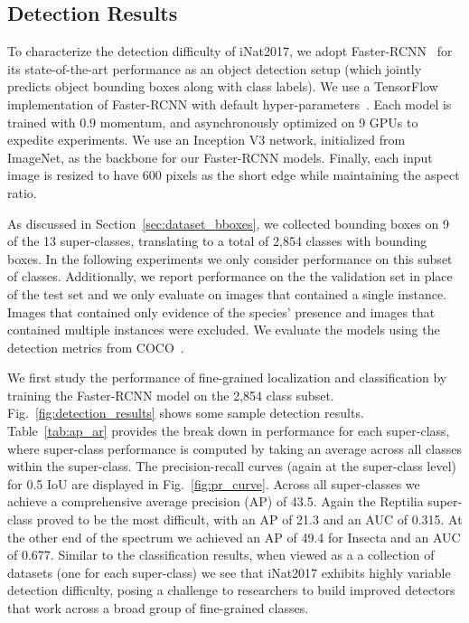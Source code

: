 \documentclass[10pt,twocolumn,letterpaper]{article}
\begin{document}
\subsection{Detection Results}
To characterize the detection difficulty of iNat2017, we adopt Faster-RCNN~\cite{ren2017faster} for its state-of-the-art performance as an object detection setup (which jointly predicts object bounding boxes along with class labels). We use a TensorFlow~\cite{abadi2016tensorflow} implementation of Faster-RCNN with default hyper-parameters~\cite{huang2017speed}. Each model is trained with 0.9 momentum, and asynchronously optimized on 9 GPUs to expedite experiments. We use an Inception V3 network, initialized from ImageNet, as the backbone for our Faster-RCNN models. Finally, each input image is resized to have 600 pixels as the short edge while maintaining the aspect ratio.

As discussed in Section~\ref{sec:dataset_bboxes}, we collected bounding boxes on 9 of the 13 super-classes, translating to a total of 2,854 classes with bounding boxes. In the following experiments we only consider performance on this subset of classes. Additionally, we report performance on the the validation set in place of the test set and we only evaluate on images that contained a single instance. Images that contained only evidence of the species' presence and images that contained multiple instances were excluded. We evaluate the models using the detection metrics from COCO~\cite{lin2014microsoft}.



We first study the performance of fine-grained localization and classification by training the Faster-RCNN model on the 2,854 class subset. Fig.~\ref{fig:detection_results} shows some sample detection results. Table~\ref{tab:ap_ar} provides the break down in performance for each super-class, where super-class performance is computed by taking an average across all classes within the super-class. The precision-recall curves (again at the super-class level) for 0.5 IoU are displayed in Fig.~\ref{fig:pr_curve}. Across all super-classes we achieve a comprehensive average precision (AP) of 43.5. Again the Reptilia super-class proved to be the most difficult, with an AP of 21.3 and an AUC of 0.315. At the other end of the spectrum we achieved an AP of 49.4 for Insecta and an AUC of 0.677. Similar to the classification results, when viewed as a a collection of datasets (one for each super-class) we see that iNat2017 exhibits highly variable detection difficulty, posing a challenge to researchers to build improved detectors that work across a broad group of fine-grained classes.
\end{document}
